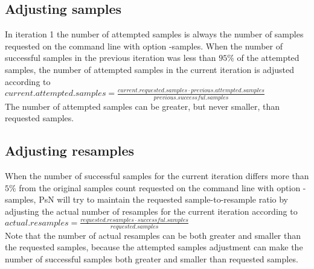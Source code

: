 \subsection{Adjusting samples}
In iteration 1 the number of attempted samples is always the number of samples requested on the command line with option -samples. When the number of successful samples in the previous iteration was less than $95\%$ of the attempted samples, the number of attempted samples in the current iteration is adjusted according to\\
$current.attempted.samples=\frac{current.requested.samples \cdot previous.attempted.samples}{previous.successful.samples}$\\
The number of attempted samples can be greater, but never smaller, than requested samples.

\subsection{Adjusting resamples}
When the number of successful samples for the current iteration differs more than $5\%$ from the original samples count requested on the command line with option -samples, PsN will try to maintain the requested sample-to-resample ratio by
adjusting the actual number of resamples for the current iteration according to \\
$actual.resamples=\frac{requested.resamples\cdot successful.samples}{requested.samples}$\\
Note that the number of actual resamples can be both greater and smaller than the requested samples, because the attempted samples adjustment can make the number of successful samples both greater and smaller than requested samples.



